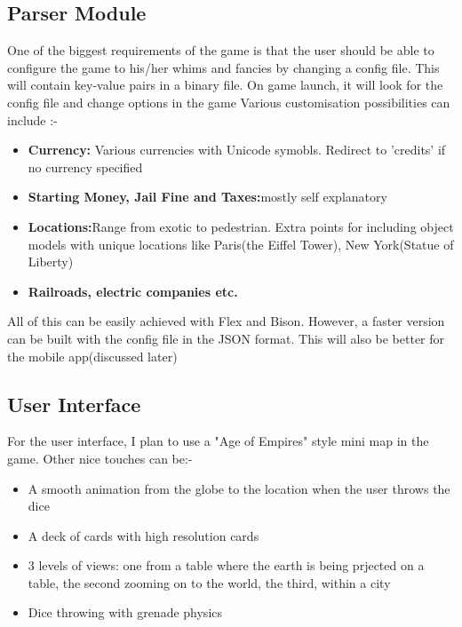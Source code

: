 \documentclass[a4paper,12pt]{article}
\begin{document}
\subsection{Parser Module}

One of the biggest requirements of the game is that the user should be able to configure the game to his/her whims and fancies by changing a config file. This will contain key-value pairs in a binary file. On game launch, it will look for the config file and change options in the game
\newline
\newline
Various customisation possibilities can include :-

\begin{itemize}
	\item{\textbf{Currency:} Various currencies with Unicode symobls. Redirect to 'credits' if no currency specified }
	\item{\textbf{Starting Money, Jail Fine and Taxes:}mostly self explanatory}
	\item{\textbf{Locations:}Range from exotic to pedestrian. Extra points for including object models with unique locations like Paris(the Eiffel Tower), New York(Statue of Liberty)}
	\item{\textbf{Railroads, electric companies etc.}}
\end{itemize}

All of this can be easily achieved with Flex and Bison. However, a faster version can be built with the config file in the JSON format. This will also be better for the mobile app(discussed later)

\subsection{User Interface}
For the user interface, I plan to use a "Age of Empires" style mini map in the game. Other nice touches can be:-
\begin{itemize}
\item{A smooth animation from the globe to the location when the user throws the dice}
\item{A deck of cards with high resolution cards}
\item{3 levels of views: one from a table where the earth is being prjected on a table, the second zooming on to the world, the third, within a city}
\item{Dice throwing with grenade physics}
\end{itemize}
\end{document}
